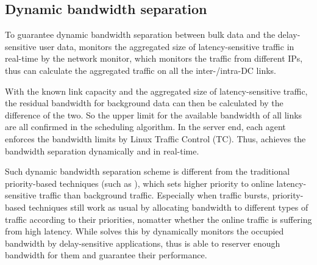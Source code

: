 %
%
%
%

\subsection{Dynamic bandwidth separation}
\label{subsec:system:separation}

To guarantee dynamic bandwidth separation between bulk data and the delay-sensitive user data, \name monitors the aggregated size of latency-sensitive traffic in real-time by the network monitor, which monitors the traffic from different IPs, thus can calculate the aggregated traffic on all the inter-/intra-DC links.

With the known link capacity and the aggregated size of latency-sensitive traffic, the residual bandwidth for background data can then be calculated by the difference of the two. So the upper limit for the available bandwidth of all links are all confirmed in the scheduling algorithm. In the server end, each agent enforces the bandwidth limits by Linux Traffic Control (TC). Thus, \name achieves the bandwidth separation dynamically and in real-time.

Such dynamic bandwidth separation scheme is different from the traditional priority-based techniques (such as \cite{kumar2015bwe}), which sets higher priority to online latency-sensitive traffic than background traffic. Especially when traffic bursts, priority-based techniques still work as usual by allocating bandwidth to different types of traffic according to their priorities, nomatter whether the online traffic is suffering from high latency. While \name solves this by dynamically monitors the occupied bandwidth by delay-sensitive applications, thus is able to reserver enough bandwidth for them and guarantee their performance.


